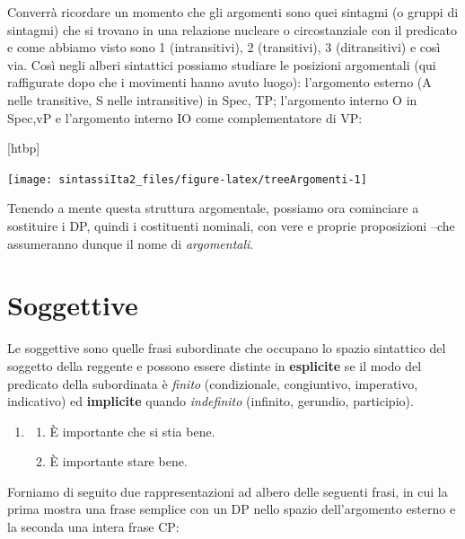 \documentclass[
  a4paper,
  twoside,
  11pt,
  chapterprefix=false,
  bibliography=totocnumbered,
  listof=flat]{scrbook}
\makeatletter
\providecommand{\tightlist}{%
  \setlength{\itemsep}{0pt}\setlength{\parskip}{0pt}}
\def\fps@figure{htbp}
\renewenvironment{figure}[1][\fps@figure]{
  \edef\@tempa{\noexpand\@float{figure}[#1]} 
  \@tempa
  \sffamily
}{
  \end@float
}
\makeatother
\begin{document}
Converrà ricordare un momento che gli argomenti sono quei sintagmi (o gruppi di sintagmi) che si trovano in una relazione nucleare o circostanziale con il predicato e come abbiamo visto sono 1 (intransitivi), 2 (transitivi), 3 (ditransitivi) e così via. Così negli alberi sintattici possiamo studiare le posizioni argomentali (qui raffigurate dopo che i movimenti hanno avuto luogo): l'argomento esterno (A nelle transitive, S nelle intransitive) in Spec, TP; l'argomento interno O in Spec,vP e l'argomento interno IO come complementatore di VP:

\begin{figure}

{\centering \texttt{[image: sintassiIta2\_files/figure-latex/treeArgomenti-1]} 

}

\caption{Struttura argomentale}\label{fig:treeArgomenti}
\end{figure}

Tenendo a mente questa struttura argomentale, possiamo ora cominciare a sostituire i DP, quindi i costituenti nominali, con vere e proprie proposizioni --che assumeranno dunque il nome di \emph{argomentali}.

\hypertarget{soggettive}{%
\section{Soggettive}\label{soggettive}}

Le soggettive sono quelle frasi subordinate che occupano lo spazio sintattico del soggetto della reggente e possono essere distinte in \textbf{esplicite} se il modo del predicato della subordinata è \emph{finito} (condizionale, congiuntivo, imperativo, indicativo) ed \textbf{implicite} quando \emph{indefinito} (infinito, gerundio, participio).

\begin{enumerate}
\def\labelenumi{(\arabic{enumi})}
\setcounter{enumi}{27}
\item
  \begin{enumerate}
  \def\labelenumii{\alph{enumii}.}
  \tightlist
  \item
    È importante che si stia bene.
  \item
    È importante stare bene.
  \end{enumerate}
\end{enumerate}

Forniamo di seguito due rappresentazioni ad albero delle seguenti frasi, in cui la prima mostra una frase semplice con un DP nello spazio dell'argomento esterno e la seconda una intera frase CP:
\end{document}
